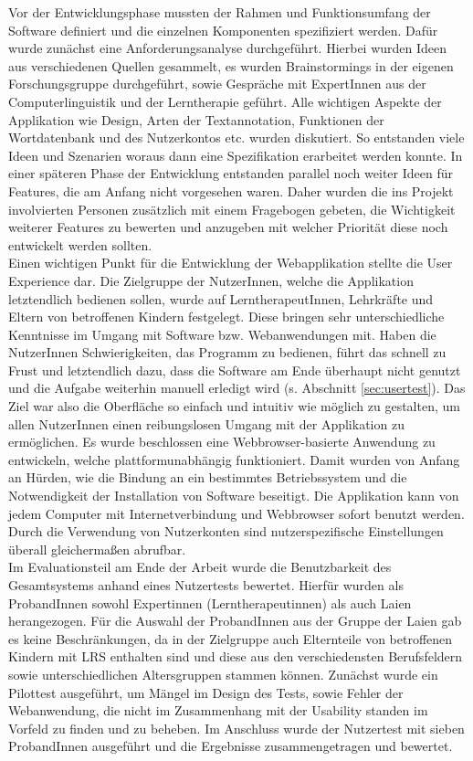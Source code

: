 Vor der Entwicklungsphase mussten der Rahmen und Funktionsumfang der Software definiert und die einzelnen Komponenten spezifiziert werden. Dafür wurde zunächst eine Anforderungsanalyse durchgeführt. Hierbei wurden Ideen aus verschiedenen Quellen gesammelt, es wurden Brainstormings in der eigenen Forschungsgruppe durchgeführt, sowie Gespräche mit ExpertInnen aus der Computerlinguistik und der Lerntherapie geführt. Alle wichtigen Aspekte der Applikation wie Design, Arten der Textannotation, Funktionen der Wortdatenbank und des Nutzerkontos etc. wurden diskutiert. So entstanden viele Ideen und Szenarien woraus dann eine Spezifikation erarbeitet werden konnte. In einer späteren Phase der Entwicklung entstanden parallel noch weiter Ideen für Features, die am Anfang nicht vorgesehen waren. Daher wurden die ins Projekt involvierten Personen zusätzlich mit einem Fragebogen gebeten, die Wichtigkeit weiterer Features zu bewerten und anzugeben mit welcher Priorität diese noch entwickelt werden sollten.\\
Einen wichtigen Punkt für die Entwicklung der Webapplikation stellte die User Experience dar. Die Zielgruppe der NutzerInnen, welche die Applikation letztendlich bedienen sollen, wurde auf LerntherapeutInnen, Lehrkräfte und Eltern von betroffenen Kindern festgelegt. Diese bringen sehr unterschiedliche Kenntnisse im Umgang mit Software bzw. Webanwendungen mit. Haben die NutzerInnen Schwierigkeiten, das Programm zu bedienen, führt das schnell zu Frust und letztendlich dazu, dass die Software am Ende überhaupt nicht genutzt und die Aufgabe weiterhin manuell erledigt wird (s. Abschnitt \ref{sec:usertest}). Das Ziel war also die Oberfläche so einfach und intuitiv wie möglich zu gestalten, um allen NutzerInnen einen reibungslosen Umgang mit der Applikation zu ermöglichen. Es wurde beschlossen eine Webbrowser-basierte Anwendung zu entwickeln, welche plattformunabhängig funktioniert. Damit wurden von Anfang an Hürden, wie die Bindung an ein bestimmtes Betriebssystem und die Notwendigkeit der Installation von Software beseitigt. Die Applikation kann von jedem Computer mit Internetverbindung und Webbrowser sofort benutzt werden. Durch die Verwendung von Nutzerkonten sind nutzerspezifische Einstellungen überall gleichermaßen abrufbar.\\

Im Evaluationsteil am Ende der Arbeit wurde die Benutzbarkeit des Gesamtsystems anhand eines Nutzertests bewertet. Hierfür wurden als ProbandInnen sowohl Expertinnen (Lerntherapeutinnen) als auch Laien herangezogen. Für die Auswahl der ProbandInnen aus der Gruppe der Laien gab es keine Beschränkungen, da in der Zielgruppe auch Elternteile von betroffenen Kindern mit LRS enthalten sind und diese aus den verschiedensten Berufsfeldern sowie unterschiedlichen Altersgruppen stammen können. Zunächst wurde ein Pilottest ausgeführt, um Mängel im Design des Tests, sowie Fehler der Webanwendung, die nicht im Zusammenhang mit der Usability standen im Vorfeld zu finden und zu beheben. Im Anschluss wurde der Nutzertest mit sieben ProbandInnen ausgeführt und die Ergebnisse zusammengetragen und bewertet.\\

